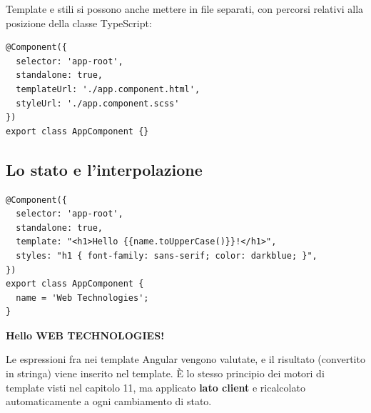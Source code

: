 Template e stili si possono anche mettere in file separati, con percorsi
relativi alla posizione della classe TypeScript:

\begin{affianco}[0.46][c]
\begin{lstlisting}[style=ts, name=app.component.ts]
@Component({
  selector: 'app-root',
  standalone: true,
  templateUrl: './app.component.html',
  styleUrl: './app.component.scss'
})
export class AppComponent {}
\end{lstlisting}
\risultato
\begin{immagine}
\end{immagine}
\end{affianco}

\subsection{Lo stato e l'interpolazione}

\begin{affianco}[0.5][c]
\codicepiccolo
\begin{lstlisting}[style=ts, name=app.component.ts]
@Component({
  selector: 'app-root',
  standalone: true,
  template: "<h1>Hello {{name.toUpperCase()}}!</h1>",
  styles: "h1 { font-family: sans-serif; color: darkblue; }",
})
export class AppComponent {
  name = 'Web Technologies';
}
\end{lstlisting}
\risultato
\begin{browser}[AngularApp]
  {\Lato\bfseries\LARGE\color{css-darkblue} Hello WEB TECHNOLOGIES!\par}
\end{browser}
\end{affianco}

Le espressioni fra \code{\{\{ \}\}} nei template Angular vengono valutate, e il
risultato (convertito in stringa) viene inserito nel template. È lo stesso
principio dei motori di template visti nel capitolo 11, ma applicato
\textbf{lato client} e ricalcolato automaticamente a ogni cambiamento di stato.

